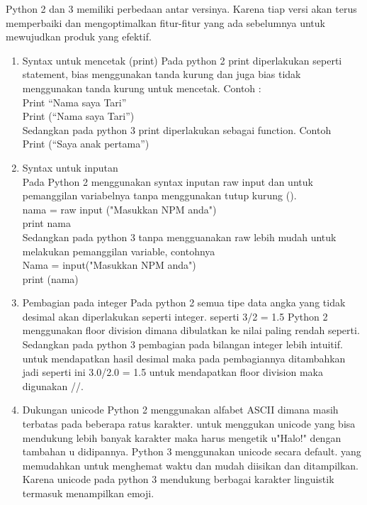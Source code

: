 Python 2 dan 3 memiliki perbedaan antar versinya. Karena tiap versi akan terus memperbaiki dan mengoptimalkan fitur-fitur yang ada sebelumnya untuk mewujudkan produk yang efektif. 
\begin{enumerate}

\item Syntax untuk mencetak (print)
Pada python 2 print diperlakukan seperti statement, bias menggunakan tanda kurung dan juga bias tidak menggunakan tanda kurung untuk mencetak.
Contoh : \\
Print “Nama saya Tari” \\
Print (“Nama saya Tari”) \\
Sedangkan pada python 3 print diperlakukan sebagai function.
Contoh  \\
Print (“Saya anak pertama”) 

\item Syntax untuk inputan \\
Pada Python 2 menggunakan syntax inputan raw input dan untuk pemanggilan variabelnya tanpa menggunakan tutup kurung (). \\
nama = raw input ("Masukkan NPM anda")\\
print nama  \\
Sedangkan pada python 3 tanpa mengguanakan raw lebih mudah untuk melakukan pemanggilan variable, contohnya \\
Nama = input("Masukkan NPM anda") \\
print (nama) 

\item Pembagian pada integer
Pada python 2 semua tipe data angka yang tidak desimal akan diperlakukan seperti integer. seperti 3/2 = 1.5 Python 2 menggunakan floor division dimana dibulatkan ke nilai paling rendah seperti. Sedangkan pada python 3 pembagian pada bilangan integer lebih intuitif. untuk mendapatkan hasil desimal maka pada pembagiannya ditambahkan jadi seperti ini 3.0/2.0 = 1.5 untuk mendapatkan floor division maka digunakan //. 

\item Dukungan unicode
Python 2 menggunakan alfabet ASCII dimana masih terbatas pada beberapa ratus karakter. untuk menggukan unicode yang bisa mendukung lebih banyak karakter maka harus mengetik u"Halo!" dengan tambahan u didipannya.
Python 3 menggunakan unicode secara default. yang memudahkan untuk menghemat waktu dan mudah diisikan dan ditampilkan. Karena unicode pada python 3 mendukung berbagai karakter linguistik termasuk menampilkan emoji.

\end{enumerate}
